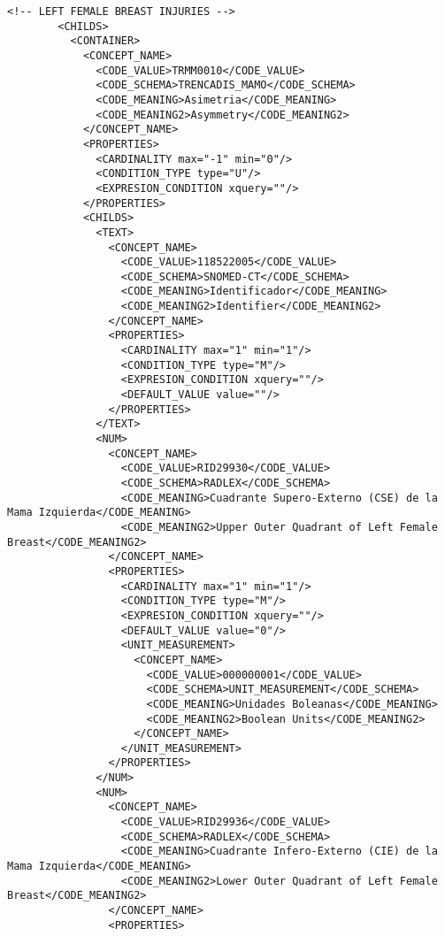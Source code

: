 \begin{lstlisting}[label=dicom-report,caption=Informe estructurado de una exploración de mama]
        <!-- LEFT FEMALE BREAST INJURIES -->
        <CHILDS>
          <CONTAINER>
            <CONCEPT_NAME>
              <CODE_VALUE>TRMM0010</CODE_VALUE>
              <CODE_SCHEMA>TRENCADIS_MAMO</CODE_SCHEMA>
              <CODE_MEANING>Asimetria</CODE_MEANING>
              <CODE_MEANING2>Asymmetry</CODE_MEANING2>
            </CONCEPT_NAME>
            <PROPERTIES>
              <CARDINALITY max="-1" min="0"/>
              <CONDITION_TYPE type="U"/>
              <EXPRESION_CONDITION xquery=""/>
            </PROPERTIES>
            <CHILDS>
              <TEXT>
                <CONCEPT_NAME>
                  <CODE_VALUE>118522005</CODE_VALUE>
                  <CODE_SCHEMA>SNOMED-CT</CODE_SCHEMA>
                  <CODE_MEANING>Identificador</CODE_MEANING>
                  <CODE_MEANING2>Identifier</CODE_MEANING2>
                </CONCEPT_NAME>
                <PROPERTIES>
                  <CARDINALITY max="1" min="1"/>
                  <CONDITION_TYPE type="M"/>
                  <EXPRESION_CONDITION xquery=""/>
                  <DEFAULT_VALUE value=""/>
                </PROPERTIES>
              </TEXT>
              <NUM>
                <CONCEPT_NAME>
                  <CODE_VALUE>RID29930</CODE_VALUE>
                  <CODE_SCHEMA>RADLEX</CODE_SCHEMA>
                  <CODE_MEANING>Cuadrante Supero-Externo (CSE) de la Mama Izquierda</CODE_MEANING>
                  <CODE_MEANING2>Upper Outer Quadrant of Left Female Breast</CODE_MEANING2>
                </CONCEPT_NAME>
                <PROPERTIES>
                  <CARDINALITY max="1" min="1"/>
                  <CONDITION_TYPE type="M"/>
                  <EXPRESION_CONDITION xquery=""/>
                  <DEFAULT_VALUE value="0"/>
                  <UNIT_MEASUREMENT>
                    <CONCEPT_NAME>
                      <CODE_VALUE>000000001</CODE_VALUE>
                      <CODE_SCHEMA>UNIT_MEASUREMENT</CODE_SCHEMA>
                      <CODE_MEANING>Unidades Boleanas</CODE_MEANING>
                      <CODE_MEANING2>Boolean Units</CODE_MEANING2>
                    </CONCEPT_NAME>
                  </UNIT_MEASUREMENT>
                </PROPERTIES>
              </NUM>
              <NUM>
                <CONCEPT_NAME>
                  <CODE_VALUE>RID29936</CODE_VALUE>
                  <CODE_SCHEMA>RADLEX</CODE_SCHEMA>
                  <CODE_MEANING>Cuadrante Infero-Externo (CIE) de la Mama Izquierda</CODE_MEANING>
                  <CODE_MEANING2>Lower Outer Quadrant of Left Female Breast</CODE_MEANING2>
                </CONCEPT_NAME>
                <PROPERTIES>

\end{lstlisting}
